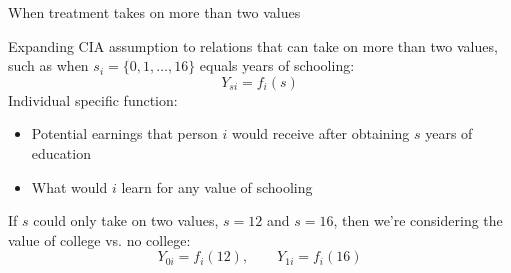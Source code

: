 \documentclass[compress, 8pt]{beamer}
\begin{document}
\begin{frame}{When treatment takes on more than two values}

Expanding CIA assumption to relations that can take on more than two values, such as when $s_i = \{0, 1, \dots, 16\}$ equals years of schooling:
\begin{equation*}
    Y_{si} = f_i (s)
\end{equation*}
Individual specific function:
\begin{itemize}
    \item Potential earnings that person $i$ would receive after obtaining $s$ years of education
    \item What would $i$ learn for any value of schooling
\end{itemize}

\vspace{2ex}
If $s$ could only take on two values, $s=12$ and $s=16$, then we're considering the value of college vs. no college:
\begin{equation*}
    Y_{0i} = f_i(12), \quad \quad Y_{1i} = f_i(16)
\end{equation*}

\end{frame}
\end{document}
